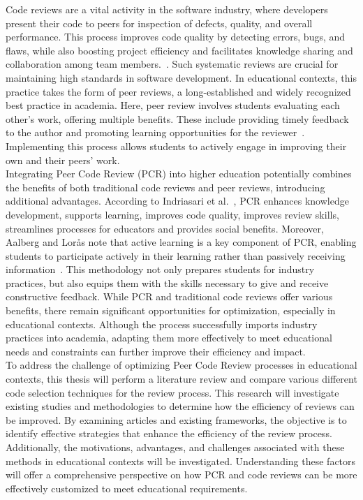 Code reviews are a vital activity in the software industry, where developers present their code to peers for inspection of defects, quality, and overall performance. This process improves code quality by detecting errors, bugs, and flaws, while also boosting project efficiency and facilitates knowledge sharing and collaboration among team members.~\cite{Bosu_Microsoft, Rigby_Bird_2013}. Such systematic reviews are crucial for maintaining high standards in software development. In educational contexts, this practice takes the form of peer reviews, a long-established and widely recognized best practice in academia. Here, peer review involves students evaluating each other's work, offering multiple benefits. These include providing timely feedback to the author and promoting learning opportunities for the reviewer~\cite{Indriasari_Luxton_2020}. Implementing this process allows students to actively engage in improving their own and their peers' work. \\

Integrating Peer Code Review (PCR) into higher education potentially combines the benefits of both traditional code reviews and peer reviews, introducing additional advantages. According to Indriasari et al.~\cite{Indriasari_Luxton_2020}, PCR enhances knowledge development, supports learning, improves code quality, improves review skills, streamlines processes for educators and provides social benefits. Moreover, Aalberg and Lorås note that active learning is a key component of PCR, enabling students to participate actively in their learning rather than passively receiving information~\cite{Aalberg_Lorås_2018}. This methodology not only prepares students for industry practices, but also equips them with the skills necessary to give and receive constructive feedback. While PCR and traditional code reviews offer various benefits, there remain significant opportunities for optimization, especially in educational contexts. Although the process successfully imports industry practices into academia, adapting them more effectively to meet educational needs and constraints can further improve their efficiency and impact. \\


To address the challenge of optimizing Peer Code Review processes in educational contexts, this thesis will perform a literature review and compare various different code selection techniques for the review process. This research will investigate existing studies and methodologies to determine how the efficiency of reviews can be improved. By examining articles and existing frameworks, the objective is to identify effective strategies that enhance the efficiency of the review process. Additionally, the motivations, advantages, and challenges associated with these methods in educational contexts will be investigated. Understanding these factors will offer a comprehensive perspective on how PCR and code reviews can be more effectively customized to meet educational requirements.


